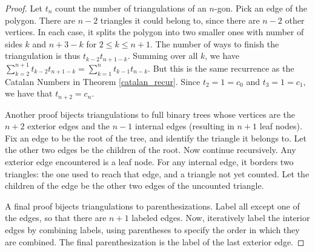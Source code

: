 \documentclass[a4paper]{article}
\begin{document}
\begin{theorem}
\begin{hl}
\begin{proof}
\begin{minipage}{0.69\linewidth}
Let $t_n$ count the number of triangulations of an $n$-gon. Pick an edge of the polygon. There are $n-2$ triangles it could belong to, since there are $n-2$ other vertices. In each case, it splits the polygon into two smaller ones with number of sides $k$ and $n+3-k$ for $2\leq k\leq n+1$. The number of ways to finish the triangulation is thus $t_{k-2}t_{n+1-k}$. Summing over all $k$, we have $\sum_{k=2}^{n+1}t_{k-2}t_{n+1-k}=\sum_{k=1}^{n}t_{k-1}t_{n-k}$. But this is the same recurrence as the Catalan Numbers in Theorem \ref{catalan_recur}. Since $t_2=1=c_0$ and $t_3=1=c_1$, we have that $t_{n+2}=c_n$.
\end{minipage}%
\begin{minipage}{0.3\linewidth}
\centering
{}
\end{minipage}

\medskip

Another proof bijects triangulations to full binary trees whose vertices are the $n+2$ exterior edges and the $n-1$ internal edges (resulting in $n+1$ leaf nodes). Fix an edge to be the root of the tree, and identify the triangle it belongs to. Let the other two edges be the children of the root. Now continue recursively. Any exterior edge encountered is a leaf node. For any internal edge, it borders two triangles: the one used to reach that edge, and a triangle not yet counted. Let the children of the edge be the other two edges of the uncounted triangle.

\medskip

A final proof bijects triangulations to parenthesizations. Label all except one of the edges, so that there are $n+1$ labeled edges. Now, iteratively label the interior edges by combining labels, using parentheses to specify the order in which they are combined. The final parenthesization is the label of the last exterior edge.


\end{proof}
\end{hl}
\end{theorem}
\end{document}
